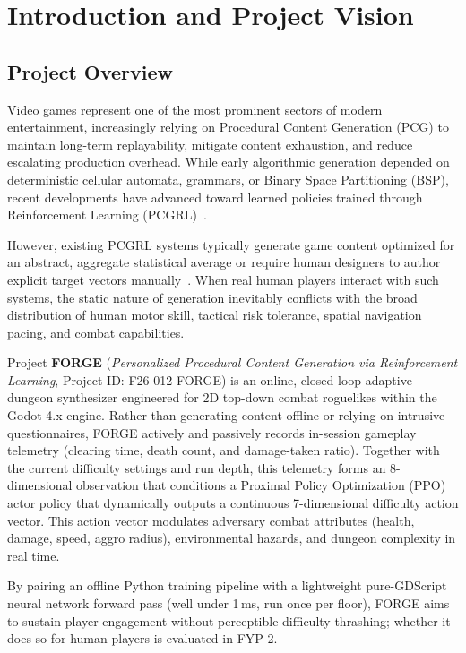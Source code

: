 \chapter{Introduction and Project Vision}
\label{chap:intro}

\section{Project Overview}
Video games represent one of the most prominent sectors of modern entertainment, increasingly relying on Procedural Content Generation (PCG) to maintain long-term replayability, mitigate content exhaustion, and reduce escalating production overhead. While early algorithmic generation depended on deterministic cellular automata, grammars, or Binary Space Partitioning (BSP), recent developments have advanced toward learned policies trained through Reinforcement Learning (PCGRL)~\cite{khalifa2020pcgrl}. 

However, existing PCGRL systems typically generate game content optimized for an abstract, aggregate statistical average or require human designers to author explicit target vectors manually~\cite{earle2021controllable}. When real human players interact with such systems, the static nature of generation inevitably conflicts with the broad distribution of human motor skill, tactical risk tolerance, spatial navigation pacing, and combat capabilities.

Project \textbf{FORGE} (\textit{Personalized Procedural Content Generation via Reinforcement Learning}, Project ID: F26-012-FORGE) is an online, closed-loop adaptive dungeon synthesizer engineered for 2D top-down combat roguelikes within the Godot 4.x engine. Rather than generating content offline or relying on intrusive questionnaires, FORGE actively and passively records in-session gameplay telemetry (clearing time, death count, and damage-taken ratio). Together with the current difficulty settings and run depth, this telemetry forms an 8-dimensional observation that conditions a Proximal Policy Optimization (PPO)~\cite{schulman2017proximal} actor policy that dynamically outputs a continuous 7-dimensional difficulty action vector. This action vector modulates adversary combat attributes (health, damage, speed, aggro radius), environmental hazards, and dungeon complexity in real time. 

By pairing an offline Python training pipeline with a lightweight pure-GDScript neural network forward pass (well under 1\,ms, run once per floor), FORGE aims to sustain player engagement without perceptible difficulty thrashing; whether it does so for human players is evaluated in FYP-2.

